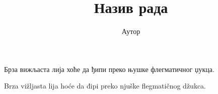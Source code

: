 \documentclass[11pt]{article}
\author{Аутор}
\title{Назив рада}
\date{}
\theoremstyle{definition}
\begin{document}
\maketitle

Брза вижљаста лија хоће да ђипи преко њушке флегматичног џукца.

Brza vižljasta lija hoće da đipi preko njuške flegmatičnog džukca.
\end{document}
